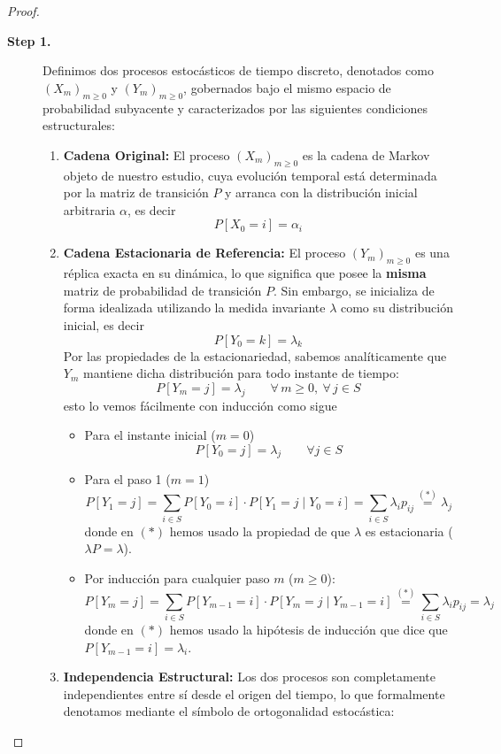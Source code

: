 \documentclass[10pt]{book}
\newcommand{\tbf}{\textbf}
\begin{document}
\begin{teo}
\begin{proof}
\begin{description}
    \item[\tbf{Step 1.}] Definimos dos procesos estocásticos de tiempo discreto, denotados como $(X_m)_{m \ge 0}$ y $(Y_m)_{m \ge 0}$, gobernados bajo el mismo espacio de probabilidad subyacente y caracterizados por las siguientes condiciones estructurales:
    \begin{enumerate}
        \item[\textbf{1)}] \textbf{Cadena Original:} El proceso $(X_m)_{m \ge 0}$ es la cadena de Markov objeto de nuestro estudio, cuya evolución temporal está determinada por la matriz de transición $P$ y arranca con la distribución inicial arbitraria $\alpha$, es decir
        $$P[X_0 = i] = \alpha_i$$
        \item[\textbf{2)}] \textbf{Cadena Estacionaria de Referencia:} El proceso $(Y_m)_{m \ge 0}$ es una réplica exacta en su dinámica, lo que significa que posee la \textbf{misma} matriz de probabilidad de transición $P$. Sin embargo, se inicializa de forma idealizada utilizando la medida invariante $\lambda$ como su distribución inicial, es decir
        $$P[Y_0 = k] = \lambda_k$$
        Por las propiedades de la estacionariedad, sabemos analíticamente que $Y_m$ mantiene dicha distribución para todo instante de tiempo:
        \[
        P[Y_m = j] = \lambda_j \qquad \forall \, m \ge 0, \ \forall \, j \in S
        \]
        esto lo vemos fácilmente con inducción como sigue
        \begin{itemize}
            \item Para el instante inicial ($m=0$)
            $$P[Y_0 = j] = \lambda_j \qquad \forall j \in S$$
            \item Para el paso 1 ($m=1$)
            $$P[Y_1 = j] = \sum_{i \in S} P[Y_0 = i] \cdot P[Y_1 = j \mid Y_0 = i]=\sum_{i \in S} \lambda_i p_{ij}\overset{(*)}{=} \lambda_j$$
            donde en $(*)$ hemos usado la propiedad de que $\lambda$ es estacionaria ($\lambda P = \lambda$).
            \item Por inducción para cualquier paso $m$ ($m \ge 0$):
            $$P[Y_m = j] = \sum_{i \in S} P[Y_{m-1} = i] \cdot P[Y_m = j \mid Y_{m-1} = i]\overset{(*)}{=}\sum_{i \in S} \lambda_i p_{ij}=\lambda_j$$
            donde en $(*)$ hemos usado la hipótesis de inducción que dice que $P[Y_{m-1} = i] = \lambda_i$.
        \end{itemize}
        \item[\textbf{3)}] \textbf{Independencia Estructural:} Los dos procesos son completamente independientes entre sí desde el origen del tiempo, lo que formalmente denotamos mediante el símbolo de ortogonalidad estocástica:

\end{enumerate}
\end{description}
\end{proof}
\end{teo}
\end{document}
